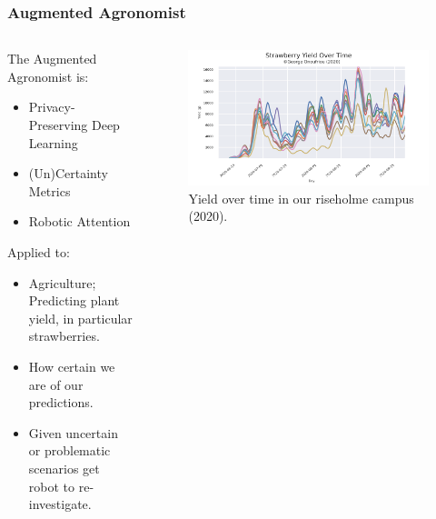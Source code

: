 \documentclass[aspectratio=169]{beamer}
\begin{document}
  \begin{frame}
    \frametitle{Augmented Agronomist}
    \begin{columns}
      \begin{column}{0.5\textwidth}
        The Augmented Agronomist is:
        \begin{itemize}
          \item Privacy-Preserving Deep Learning
          \item (Un)Certainty Metrics
          \item Robotic Attention
        \end{itemize}
        Applied to:
        \begin{itemize}
          \item Agriculture; Predicting plant yield, in particular strawberries.
          \item How certain we are of our predictions.
          \item Given uncertain or problematic scenarios get robot to re-investigate.
        \end{itemize}
      \end{column}
      \begin{column}{0.5\textwidth}
        \begin{figure}[th!]
          \centering
          \includegraphics[origin=c,width=1\textwidth]{yield.png}
          \caption{Yield over time in our riseholme campus (2020).}
          \label{fig:yield}
        \end{figure}
      \end{column}
    \end{columns}
  \end{frame}
\end{document}
